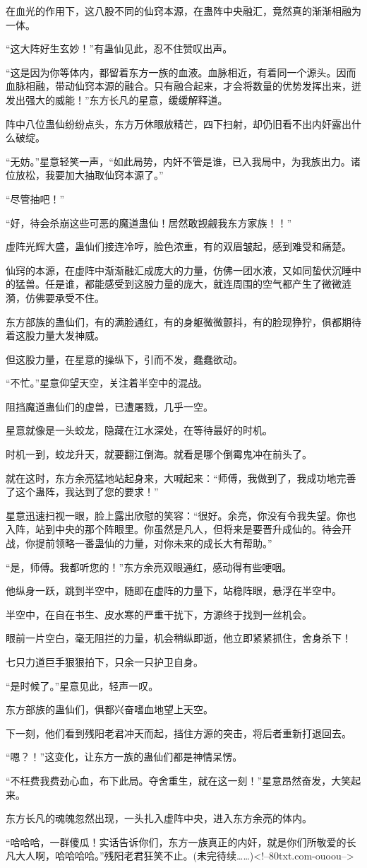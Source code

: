 \begin{this_body}
在血光的作用下，这八股不同的仙窍本源，在蛊阵中央融汇，竟然真的渐渐相融为一体。

“这大阵好生玄妙！”有蛊仙见此，忍不住赞叹出声。

“这是因为你等体内，都留着东方一族的血液。血脉相近，有着同一个源头。因而血脉相融，带动仙窍本源的融合。只有融合起来，才会将数量的优势发挥出来，迸发出强大的威能！”东方长凡的星意，缓缓解释道。

阵中八位蛊仙纷纷点头，东方万休眼放精芒，四下扫射，却仍旧看不出内奸露出什么破绽。

“无妨。”星意轻笑一声，“如此局势，内奸不管是谁，已入我局中，为我族出力。诸位放松，我要加大抽取仙窍本源了。”

“尽管抽吧！”

“好，待会杀崩这些可恶的魔道蛊仙！居然敢觊觎我东方家族！！”

虚阵光辉大盛，蛊仙们接连冷哼，脸色浓重，有的双眉皱起，感到难受和痛楚。

仙窍的本源，在虚阵中渐渐融汇成庞大的力量，仿佛一团水液，又如同蛰伏沉睡中的猛兽。任是谁，都能感受到这股力量的庞大，就连周围的空气都产生了微微涟漪，仿佛要承受不住。

东方部族的蛊仙们，有的满脸通红，有的身躯微微颤抖，有的脸现狰狞，俱都期待着这股力量大发神威。

但这股力量，在星意的操纵下，引而不发，蠢蠢欲动。

“不忙。”星意仰望天空，关注着半空中的混战。

阻挡魔道蛊仙们的虚兽，已遭屠戮，几乎一空。

星意就像是一头蛟龙，隐藏在江水深处，在等待最好的时机。

时机一到，蛟龙升天，就要翻江倒海。就看是哪个倒霉鬼冲在前头了。

就在这时，东方余亮猛地站起身来，大喊起来：“师傅，我做到了，我成功地完善了这个蛊阵，我达到了您的要求！”

星意迅速扫视一眼，脸上露出欣慰的笑容：“很好。余亮，你没有令我失望。你也入阵，站到中央的那个阵眼里。你虽然是凡人，但将来是要晋升成仙的。待会开战，你提前领略一番蛊仙的力量，对你未来的成长大有帮助。”

“是，师傅。我都听您的！”东方余亮双眼通红，感动得有些哽咽。

他纵身一跃，跳到半空中，随即在虚阵的力量下，站稳阵眼，悬浮在半空中。

半空中，在自在书生、皮水寒的严重干扰下，方源终于找到一丝机会。

眼前一片空白，毫无阻拦的力量，机会稍纵即逝，他立即紧紧抓住，舍身杀下！

七只力道巨手狠狠拍下，只余一只护卫自身。

“是时候了。”星意见此，轻声一叹。

东方部族的蛊仙们，俱都兴奋嗜血地望上天空。

下一刻，他们看到残阳老君冲天而起，挡住方源的突击，将后者重新打退回去。

“嗯？！”这变化，让东方一族的蛊仙们都是神情呆愣。

“不枉费我费劲心血，布下此局。夺舍重生，就在这一刻！”星意昂然奋发，大笑起来。

东方长凡的魂魄忽然出现，一头扎入虚阵中央，进入东方余亮的体内。

“哈哈哈，一群傻瓜！实话告诉你们，东方一族真正的内奸，就是你们所敬爱的长凡大人啊，哈哈哈哈。”残阳老君狂笑不止。(未完待续……)<!--80txt.com-ouoou-->

\end{this_body}


